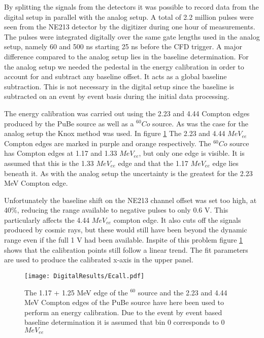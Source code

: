 \documentclass[main.tex]{subfiles}
\begin{document}
By splitting the signals from the detectors it was possible to record data from the digital setup in parallel with the analog setup. A total of 2.2 million pulses were seen from the NE213 detector by the digitizer during one hour of measurements. The pulses were integrated digitally over the same gate lengths used in the analog setup, namely 60 and 500 ns starting 25 ns before the CFD trigger. A major difference compared to the analog setup lies in the baseline determination. For the analog setup we needed the pedestal in the energy calibration in order to account for and subtract any baseline offset. It acts as a global baseline subtraction. This is not necessary in the digital setup since the baseline is subtracted on an event by event basis during the initial data processing. 

The energy calibration was carried out using the 2.23 and 4.44 Compton edges produced by the PuBe source as well as a $^{60}Co$ source. As was the case for the analog setup the Knox method was used. In figure \ref{fig:D_QDC} The 2.23 and 4.44 $MeV_{ee}$ Compton edges are marked in purple and orange respectively. The $^{60}Co$ source has Compton edges at 1.17 and 1.33 $MeV_{ee}$, but only one edge is visible. It is assumed that this is the 1.33 $MeV_{ee}$ edge and that the 1.17 $MeV_{ee}$ edge lies beneath it. As with the analog setup the uncertainty is the greatest for the 2.23 MeV Compton edge.

Unfortunately the baseline shift on the NE213 channel offset was set too high, at 40\%, reducing the range available to negative pulses to only 0.6 V. This particularly affects the 4.44 $MeV_{ee}$ compton edge. It also cuts off the signals produced by cosmic rays, but these would still have been beyond the dynamic range even if the full 1 V had been available. Inspite of this problem figure \ref{fig:D_QDC} shows that the calibration points still follow a linear trend. The fit parameters are used to produce the calibrated x-axis in the upper panel.

\begin{figure}[ht]
    \centering
        \texttt{[image: DigitalResults/Ecall.pdf]}
        \caption{The 1.17 + 1.25 MeV edge of the $^60$ source and the 2.23 and 4.44 MeV Compton edges of the PuBe source have here been used to perform an energy calibration. Due to the event by event based baseline determination it is assumed that bin 0 corresponds to 0 $MeV_{ee}$}
    \label{fig:D_QDC}
\end{figure}
\end{document}
